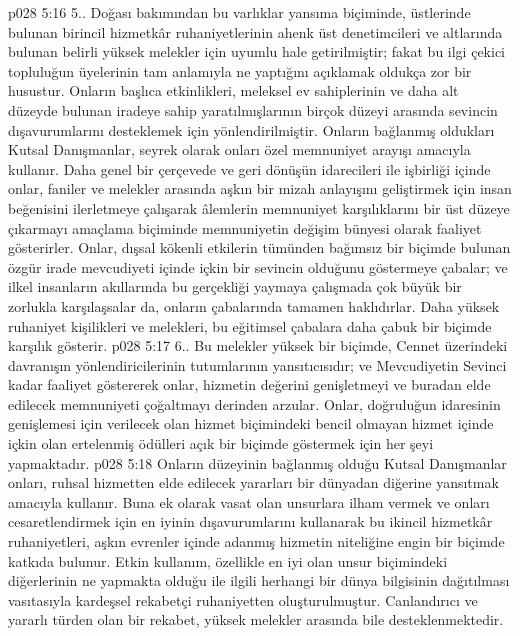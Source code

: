\vs p028 5:16 5.. Doğası bakımından bu varlıklar yansıma biçiminde, üstlerinde bulunan birincil hizmetkâr ruhaniyetlerinin ahenk üst denetimcileri ve altlarında bulunan belirli yüksek melekler için uyumlu hale getirilmiştir; fakat bu ilgi çekici topluluğun üyelerinin tam anlamıyla ne yaptığını açıklamak oldukça zor bir husustur. Onların başlıca etkinlikleri, meleksel ev sahiplerinin ve daha alt düzeyde bulunan iradeye sahip yaratılmışlarının birçok düzeyi arasında sevincin dışavurumlarını desteklemek için yönlendirilmiştir. Onların bağlanmış oldukları Kutsal Danışmanlar, seyrek olarak onları özel memnuniyet arayışı amacıyla kullanır. Daha genel bir çerçevede ve geri dönüşün idarecileri ile işbirliği içinde onlar, faniler ve melekler arasında aşkın bir mizah anlayışını geliştirmek için insan beğenisini ilerletmeye çalışarak âlemlerin memnuniyet karşılıklarını bir üst düzeye çıkarmayı amaçlama biçiminde memnuniyetin değişim bünyesi olarak faaliyet gösterirler. Onlar, dışsal kökenli etkilerin tümünden bağımsız bir biçimde bulunan özgür irade mevcudiyeti içinde içkin bir sevincin olduğunu göstermeye çabalar; ve ilkel insanların akıllarında bu gerçekliği yaymaya çalışmada çok büyük bir zorlukla karşılaşsalar da, onların çabalarında tamamen haklıdırlar. Daha yüksek ruhaniyet kişilikleri ve melekleri, bu eğitimsel çabalara daha çabuk bir biçimde karşılık gösterir.
\vs p028 5:17 6.\bibnobreakspace {}. Bu melekler yüksek bir biçimde, Cennet üzerindeki davranışın yönlendiricilerinin tutumlarının yansıtıcısıdır; ve Mevcudiyetin Sevinci kadar faaliyet göstererek onlar, hizmetin değerini genişletmeyi ve buradan elde edilecek memnuniyeti çoğaltmayı derinden arzular. Onlar, doğruluğun idaresinin genişlemesi için verilecek olan hizmet biçimindeki bencil olmayan hizmet içinde içkin olan ertelenmiş ödülleri açık bir biçimde göstermek için her şeyi yapmaktadır.
\vs p028 5:18 Onların düzeyinin bağlanmış olduğu Kutsal Danışmanlar onları, ruhsal hizmetten elde edilecek yararları bir dünyadan diğerine yansıtmak amacıyla kullanır. Buna ek olarak vasat olan unsurlara ilham vermek ve onları cesaretlendirmek için en iyinin dışavurumlarını kullanarak bu ikincil hizmetkâr ruhaniyetleri, aşkın evrenler içinde adanmış hizmetin niteliğine engin bir biçimde katkıda bulunur. Etkin kullanım, özellikle en iyi olan unsur biçimindeki diğerlerinin ne yapmakta olduğu ile ilgili herhangi bir dünya bilgisinin dağıtılması vasıtasıyla kardeşsel rekabetçi ruhaniyetten oluşturulmuştur. Canlandırıcı ve yararlı türden olan bir rekabet, yüksek melekler arasında bile desteklenmektedir.
